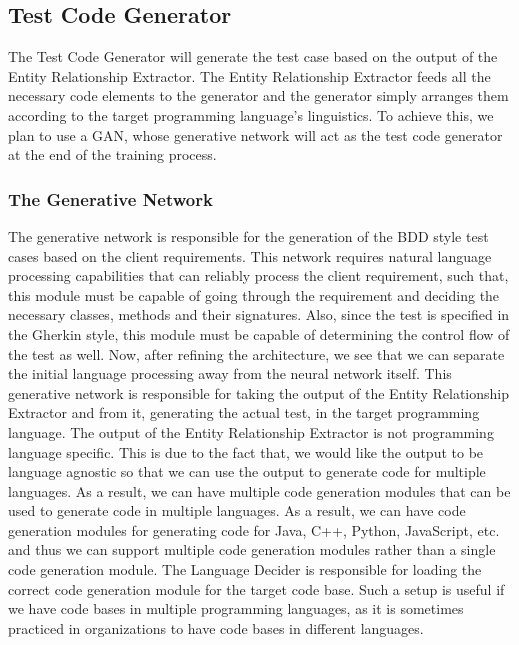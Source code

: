 \documentclass[conference, onecolumn, a4, 12pt]{IEEEtran}
\begin{document}
\subsection{Test Code Generator}
The Test Code Generator will generate the test case based on the output of the Entity Relationship Extractor. The Entity Relationship Extractor feeds all the necessary code elements to the generator and the generator simply arranges them according to the target programming language's linguistics. To achieve this, we plan to use a GAN, whose generative network will act as the test code generator at the end of the training process.

\subsubsection{The Generative Network}
The generative network is responsible for the generation of the BDD style test cases based on the client requirements. This network requires natural language processing capabilities that can reliably process the client requirement, such that, this module must be capable of going through the requirement and deciding the necessary classes, methods and their signatures. Also, since the test is specified in the Gherkin style, this module must be capable of determining the control flow of the test as well. Now, after refining the architecture, we see that we can separate the initial language processing away from the neural network itself.\newline
This generative network is responsible for taking the output of the Entity Relationship Extractor and from it, generating the actual test, in the target programming language. The output of the Entity Relationship Extractor is not programming language specific. This is due to the fact that, we would like the output to be language agnostic so that we can use the output to generate code for multiple languages. As a result, we can have multiple code generation modules that can be used to generate code in multiple languages. As a result, we can have code generation modules for generating code for Java, C++, Python, JavaScript, etc. and thus we can support multiple code generation modules rather than a single code generation module. The Language Decider is responsible for loading the correct code generation module for the target code base. Such a setup is useful if we have code bases in multiple programming languages, as it is sometimes practiced in organizations to have code bases in different languages.
\end{document}

